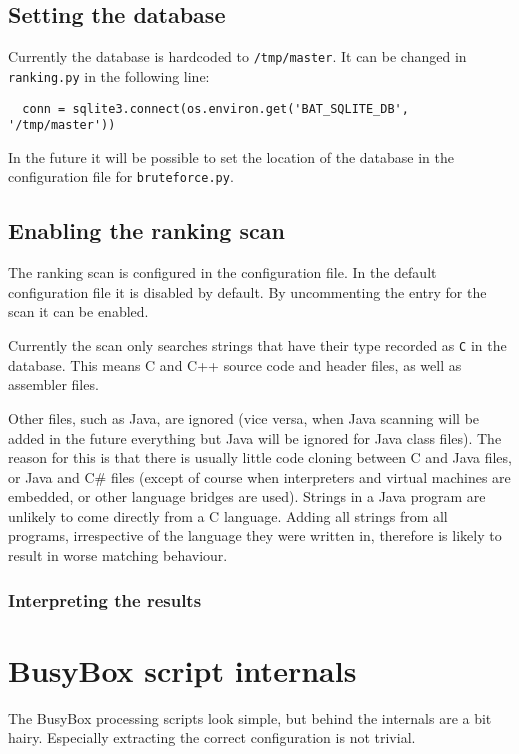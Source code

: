 \documentclass[10pt]{article}
\begin{document}
\subsection{Setting the database}

Currently the database is hardcoded to \texttt{/tmp/master}. It can be changed
in \texttt{ranking.py} in the following line:

\begin{verbatim}
  conn = sqlite3.connect(os.environ.get('BAT_SQLITE_DB', '/tmp/master'))
\end{verbatim}

In the future it will be possible to set the location of the database in the
configuration file for \texttt{bruteforce.py}.

\subsection{Enabling the ranking scan}

The ranking scan is configured in the configuration file. In the default
configuration file it is disabled by default. By uncommenting the entry for the
scan it can be enabled.

Currently the scan only searches strings that have their type recorded as
\texttt{C} in the database. This means C and C++ source code and header files,
as well as assembler files.

Other files, such as Java, are ignored (vice versa, when Java scanning will be
added in the future everything but Java will be ignored for Java class files).
The reason for this is that there is usually little code cloning between C and
Java files, or Java and C\# files (except of course when interpreters and virtual
machines are embedded, or other language bridges are used). Strings in a Java
program are unlikely to come directly from a C language. Adding all strings from
all programs, irrespective of the language they were written in, therefore is
likely to result in worse matching behaviour.

\subsubsection{Interpreting the results}

\section{BusyBox script internals}

The BusyBox processing scripts look simple, but behind the internals are a bit
hairy. Especially extracting the correct configuration is not trivial.
\end{document}
